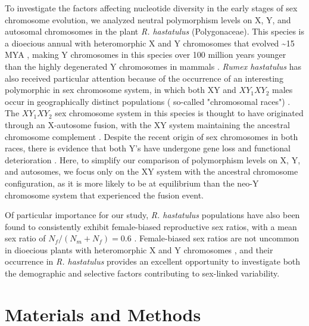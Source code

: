 \documentclass[9pt,twocolumn,twoside]{gsajnl}
\begin{document}
To investigate the factors affecting nucleotide diversity in the early stages of sex chromosome evolution, we analyzed neutral polymorphism levels on X, Y, and autosomal chromosomes in the plant \textit{R. hastatulus }(Polygonaceae). This species is a dioecious annual with heteromorphic X and Y chromosomes that evolved \textasciitilde 15 MYA \citep{quesada2011,grabowska2015,navajas2005}, making Y chromosomes in this species over 100 million years younger than the highly degenerated Y chromosomes in mammals \citep{lahn1999,ross2005dna}. \textit{Rumex hastatulus} has also received particular attention because of the occurrence of an interesting polymorphic in sex chromosome system, in which both XY and $XY_{1}XY_{2}$ males occur in geographically distinct populations ( so-called "chromosomal races") \citep{smith1963mechanism}. The $XY_{1}XY_{2}$ sex chromosome system in this species is thought to have originated through an X-autosome fusion, with the XY system maintaining the ancestral chromosome complement \citep{smith1964evolving}. Despite the recent origin of sex chromosomes in both races, there is evidence that both Y's have undergone gene loss and functional deterioration \citep{hough2014}. Here, to simplify our comparison of polymorphism levels on X, Y, and autosomes, we focus only on the XY system with the ancestral chromosome configuration,  as it is more likely to be at equilibrium than the neo-Y chromosome system that experienced the fusion event.

Of particular importance for our study, \textit{R. hastatulus} populations have also been found to consistently exhibit female-biased reproductive sex ratios, with a mean sex ratio of $N_{f}/(N_{m}+N_{f})=0.6$ \citep{pickup2013influence}. Female-biased sex ratios are not uncommon in dioecious plants with heteromorphic X and Y chromosomes \citep{field2013comparative,hough2013evolutionarily}, and their occurrence in \textit{R. hastatulus} provides an excellent opportunity to investigate both the demographic and selective factors contributing to sex-linked variability.

\section*{Materials and Methods}
\end{document}
